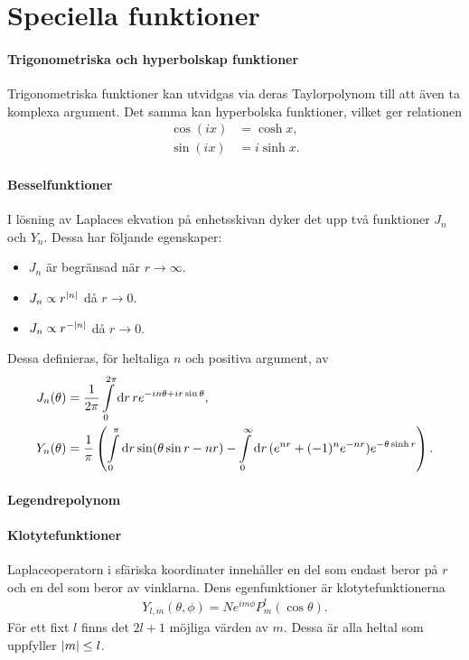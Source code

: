 \section{Speciella funktioner}

\paragraph{Trigonometriska och hyperbolskap funktioner}
Trigonometriska funktioner kan utvidgas via deras Taylorpolynom till att även ta komplexa argument. Det samma kan hyperbolska funktioner, vilket ger relationen
\begin{align*}
	\cos(ix) &= \cosh{x}, \\
	\sin(ix) &= i\sinh{x}.
\end{align*}

\paragraph{Besselfunktioner}
I lösning av Laplaces ekvation på enhetsskivan dyker det upp två funktioner $J_{n}$ och $Y_{n}$. Dessa har följande egenskaper:
\begin{itemize}
	\item $J_{n}$ är begränsad när $r\to\infty$.
	\item $J_{n}\propto r^{\abs{n}}$ då $r\to 0$.
	\item $J_{n}\propto r^{-\abs{n}}$ då $r\to 0$.
\end{itemize}
Dessa definieras, för heltaliga $n$ och positiva argument, av
\begin{align*}
	J_{n}(\theta) &= \frac{1}{2\pi}\int\limits_{0}^{2\pi}\dd{r}re^{-in\theta + ir\sin{\theta}}, \\
	Y_{n}(\theta) &= \frac{1}{\pi}\left(\int\limits_{0}^{\pi}\dd{r}\sin(\theta\sin{r} - nr) - \int\limits_{0}^{\infty}\dd{r}(e^{nr} + (-1)^{n}e^{-nr})e^{-\theta\sinh{r}}\right).
\end{align*}

\paragraph{Legendrepolynom}

\paragraph{Klotytefunktioner}
Laplaceoperatorn i sfäriska koordinater innehåller en del som endast beror på $r$ och en del som beror av vinklarna. Dens egenfunktioner är klotytefunktionerna
\begin{align*}
	Y_{l, m}(\theta, \phi) = Ne^{im\phi}P_{m}^{l}(\cos{\theta}).
\end{align*}
För ett fixt $l$ finns det $2l + 1$ möjliga värden av $m$. Dessa är alla heltal som uppfyller $\abs{m} \leq l$.